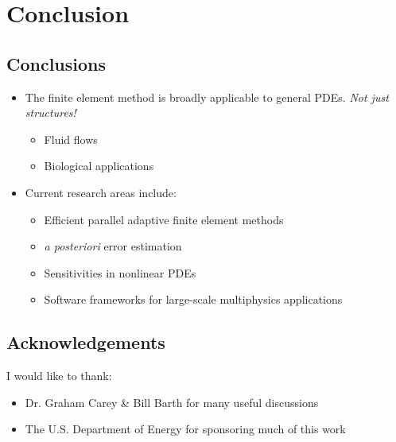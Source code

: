 \documentclass[compress,12pt]{beamer}
\begin{document}





\section{Conclusion}

\subsection{Conclusions}
\begin{frame}%
  \begin{itemize}
    
    \item The finite element method is broadly applicable to general PDEs.  \emph{Not just structures!}
      \begin{itemize}
	\item Fluid flows
	\item Biological applications
      \end{itemize}
    \item Current research areas include:
      \begin{itemize}
	\item Efficient parallel adaptive finite element methods
	\item \emph{a posteriori} error estimation
	\item Sensitivities in nonlinear PDEs
	\item Software frameworks for large-scale multiphysics applications
      \end{itemize}
  \end{itemize}
\end{frame}



\subsection{Acknowledgements}
\begin{frame}%
  I would like to thank:

  \begin{itemize}
    \item Dr. Graham Carey \& Bill Barth for many useful discussions
    \item The U.S. Department of Energy for sponsoring much of this work
  \end{itemize}
\end{frame}
\end{document}
